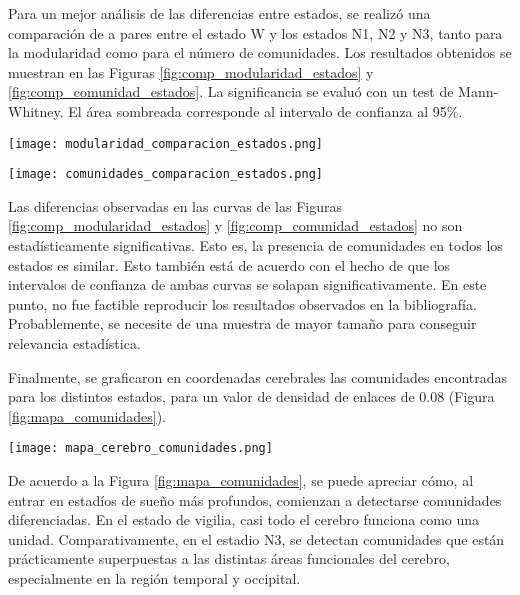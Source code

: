 \documentclass[a4paper,10pt,twocolumn,spanish]{article}
\begin{document}
Para un mejor análisis de las diferencias entre estados, se realizó una comparación de a pares entre el estado W y los estados N1, N2 y N3, tanto para la modularidad como para el número de comunidades. Los resultados obtenidos se muestran en las Figuras \ref{fig:comp_modularidad_estados} y \ref{fig:comp_comunidad_estados}. La significancia se evaluó con un test de Mann-Whitney. El área sombreada corresponde al intervalo de confianza al 95\%.

\begin{figure*}[htb]
\centering
\texttt{[image: modularidad\_comparacion\_estados.png]}
\caption{Modularidad versus densidad de enlaces - Comparación entre estados}
\label{fig:comp_modularidad_estados}
\end{figure*}

\begin{figure*}[htb]
\centering
\texttt{[image: comunidades\_comparacion\_estados.png]}
\caption{Número de comunidades detectadas versus densidad de enlaces - Comparación entre estados}
\label{fig:comp_comunidad_estados}
\end{figure*}

Las diferencias observadas en las curvas de las Figuras \ref{fig:comp_modularidad_estados} y \ref{fig:comp_comunidad_estados} no son estadísticamente significativas. Esto es, la presencia de comunidades en todos los estados es similar. Esto también está de acuerdo con el hecho de que los intervalos de confianza de ambas curvas se solapan significativamente. En este punto, no fue factible reproducir los resultados observados en la bibliografía. Probablemente, se necesite de una muestra de mayor tamaño para conseguir relevancia estadística.

Finalmente, se graficaron en coordenadas cerebrales las comunidades encontradas para los distintos estados, para un valor de densidad de enlaces de 0.08 (Figura \ref{fig:mapa_comunidades}). 

\begin{figure*}[htb]
\centering
\texttt{[image: mapa\_cerebro\_comunidades.png]}
\caption{Comunidades presentes - Comparación entre estados (algoritmo de Louvain)}
\label{fig:mapa_comunidades}
\end{figure*}

De acuerdo a la Figura \ref{fig:mapa_comunidades}, se puede apreciar cómo, al entrar en estadíos de sueño más profundos, comienzan a detectarse comunidades diferenciadas. En el estado de vigilia, casi todo el cerebro funciona como una unidad. Comparativamente, en el estadio N3, se detectan comunidades que están prácticamente superpuestas a las distintas áreas funcionales del cerebro, especialmente en la región temporal y occipital.
\end{document}
